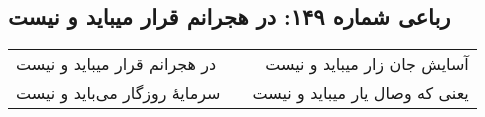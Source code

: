 \begin{center}
\section*{رباعی شماره ۱۴۹: در هجرانم قرار میباید و نیست}
\label{sec:sh149}
\begin{longtable}{l p{0.5cm} r}
در هجرانم قرار میباید و نیست
&&
آسایش جان زار میباید و نیست
\\
سرمایهٔ روزگار می‌باید و نیست
&&
یعنی که وصال یار میباید و نیست
\\
\end{longtable}
\end{center}
